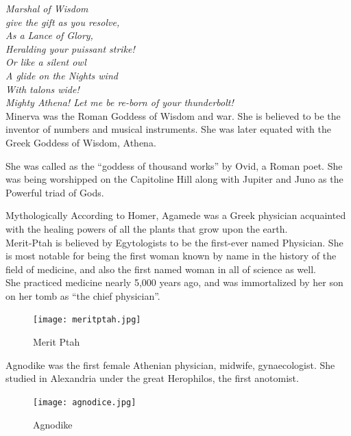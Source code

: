\documentclass[a4paper,10pt]{article}
\begin{document}
\textit{Marshal of Wisdom}\\
\textit{give the gift as you resolve,}\\
\textit{As a Lance of Glory,}\\
\textit{Heralding your puissant strike!}\\
\textit{Or like a silent owl}\\
\textit{A glide on the Nights wind}\\
\textit{With talons wide!}\\
\textit{Mighty Athena! Let me be re-born of your thunderbolt!}\\

\newblock
Minerva was the Roman Goddess of Wisdom and war. She is believed to be the inventor of numbers and musical instruments. She was later equated with the Greek Goddess of Wisdom, Athena.

She was called as the “goddess of thousand works” by Ovid, a Roman poet. She was being worshipped on the Capitoline Hill along with Jupiter and Juno as the Powerful triad of Gods.


 

\newblock
Mythologically According to Homer, Agamede was a Greek physician acquainted with the healing powers of all the plants that grow upon the earth.\\


\newblock
Merit-Ptah is believed by Egytologists to be the first-ever named Physician. She is most notable for being the first woman known by name in the history of the field of medicine, and also the first named woman in all of science as well.\\

She practiced medicine nearly 5,000 years ago, and was immortalized by her son on her tomb as “the chief physician”\cite{merit}.
\begin{center}
\begin{figure}[h]
\centering
 \texttt{[image: meritptah.jpg]}
 \caption{Merit Ptah}
\end{figure}
\end{center}

\newblock
Agnodike was the first female Athenian physician, midwife, gynaecologist. She studied in Alexandria under the great Herophilos, the first anotomist.

\begin{center}
\begin{figure}[h]
\centering
 \texttt{[image: agnodice.jpg]}
 \caption{Agnodike}
\end{figure}
\end{center}
\end{document}
